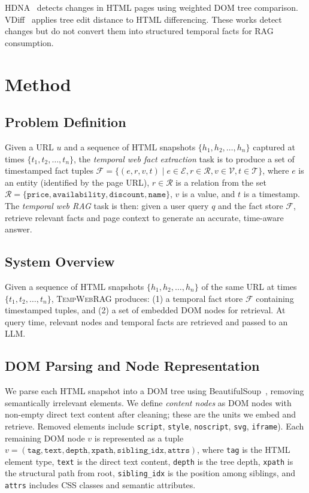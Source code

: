 \documentclass[11pt]{article}
\newcommand{\ours}{\textsc{TempWebRAG}}
\begin{document}
HDNA~\cite{hdna2023} detects changes in HTML pages using weighted DOM tree comparison. VDiff~\cite{vdiff2004} applies tree edit distance to HTML differencing. These works detect changes but do not convert them into structured temporal facts for RAG consumption.

\section{Method}
\label{sec:method}

\subsection{Problem Definition}

Given a URL $u$ and a sequence of HTML snapshots $\{h_1, h_2, \ldots, h_n\}$ captured at times $\{t_1, t_2, \ldots, t_n\}$, the \emph{temporal web fact extraction} task is to produce a set of timestamped fact tuples $\mathcal{F} = \{(e, r, v, t) \mid e \in \mathcal{E}, r \in \mathcal{R}, v \in \mathcal{V}, t \in \mathcal{T}\}$, where $e$ is an entity (identified by the page URL), $r \in \mathcal{R}$ is a relation from the set $\mathcal{R} = \{\texttt{price}, \texttt{availability}, \texttt{discount}, \texttt{name}\}$, $v$ is a value, and $t$ is a timestamp. The \emph{temporal web RAG} task is then: given a user query $q$ and the fact store $\mathcal{F}$, retrieve relevant facts and page context to generate an accurate, time-aware answer.

\subsection{System Overview}

Given a sequence of HTML snapshots $\{h_1, h_2, \ldots, h_n\}$ of the same URL at times $\{t_1, t_2, \ldots, t_n\}$, \ours{} produces: (1) a temporal fact store $\mathcal{F}$ containing timestamped tuples, and (2) a set of embedded DOM nodes for retrieval. At query time, relevant nodes and temporal facts are retrieved and passed to an LLM.

\subsection{DOM Parsing and Node Representation}

We parse each HTML snapshot into a DOM tree using BeautifulSoup~\cite{beautifulsoup}, removing semantically irrelevant elements. We define \emph{content nodes} as DOM nodes with non-empty direct text content after cleaning; these are the units we embed and retrieve. Removed elements include \texttt{script}, \texttt{style}, \texttt{noscript}, \texttt{svg}, \texttt{iframe}). Each remaining DOM node $v$ is represented as a tuple $v = (\texttt{tag}, \texttt{text}, \texttt{depth}, \texttt{xpath}, \texttt{sibling\_idx}, \texttt{attrs})$, where \texttt{tag} is the HTML element type, \texttt{text} is the direct text content, \texttt{depth} is the tree depth, \texttt{xpath} is the structural path from root, \texttt{sibling\_idx} is the position among siblings, and \texttt{attrs} includes CSS classes and semantic attributes.
\end{document}
